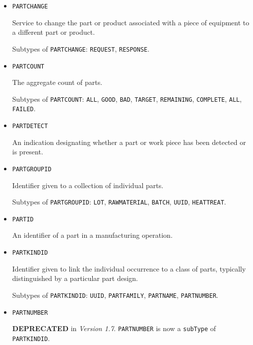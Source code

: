 \begin{itemize}
\item \texttt{PART\textunderscore CHANGE}  

Service to change the part or product associated with a piece of equipment to a different part or product.

Subtypes of \texttt{PART\textunderscore CHANGE}: \texttt{REQUEST}, \texttt{RESPONSE}.

\item \texttt{PART\textunderscore COUNT}  

The aggregate count of parts.

Subtypes of \texttt{PART\textunderscore COUNT}: \texttt{ALL}, \texttt{GOOD}, \texttt{BAD}, \texttt{TARGET}, \texttt{REMAINING}, \texttt{COMPLETE}, \texttt{ALL}, \texttt{FAILED}.

\item \texttt{PART\textunderscore DETECT}  

An indication designating whether a part or work piece has been detected or is present.


\item \texttt{PART\textunderscore GROUP\textunderscore ID}  

Identifier given to a collection of individual parts. 

Subtypes of \texttt{PART\textunderscore GROUP\textunderscore ID}: \texttt{LOT}, \texttt{RAW\textunderscore MATERIAL}, \texttt{BATCH}, \texttt{UUID}, \texttt{HEAT\textunderscore TREAT}.

\item \texttt{PART\textunderscore ID}  

An identifier of a part in a manufacturing operation.


\item \texttt{PART\textunderscore KIND\textunderscore ID}  

Identifier given to link the individual occurrence to a class of parts, typically distinguished by a particular part design.

Subtypes of \texttt{PART\textunderscore KIND\textunderscore ID}: \texttt{UUID}, \texttt{PART\textunderscore FAMILY}, \texttt{PART\textunderscore NAME}, \texttt{PART\textunderscore NUMBER}.

\item \texttt{PART\textunderscore NUMBER}  

\textbf{DEPRECATED} in \textit{Version 1.7}. \texttt{PART\textunderscore NUMBER} is now a \texttt{subType} of
\texttt{PART\textunderscore KIND\textunderscore ID}.


\end{itemize}
